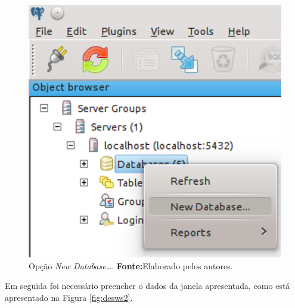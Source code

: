 	\begin{figure}[h!]
		\centerline{\includegraphics[scale=0.8]{./imagens/2_q_metodologico/4_procedimentos_resultados/43_webservice/432_desenvolvimento/desws1.png}}
		\caption[Opção \textit{New Database\ldots}]{Opção \textit{New Database\ldots}.
			\textbf{Fonte:}Elaborado pelos autores.}
		\label{fig:desws1}
	\end{figure}

	\pagebreak
	
	\par Em seguida foi necessário preencher o dados da janela apresentada, como
está apresentado na Figura \ref{fig:desws2}.
	
